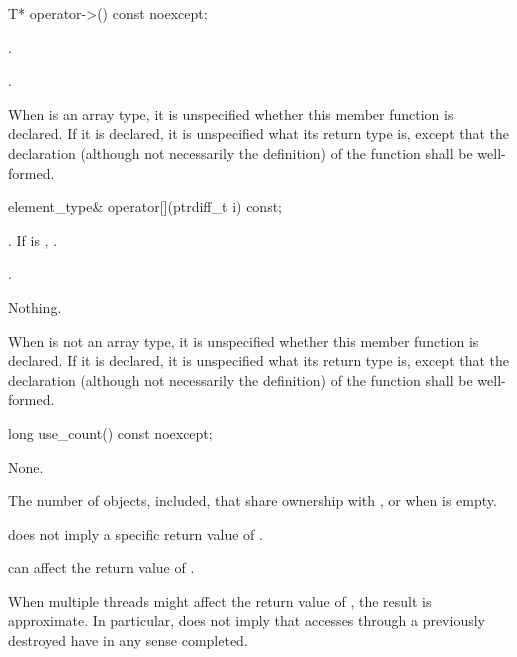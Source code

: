 %
\begin{itemdecl}
T* operator->() const noexcept;
\end{itemdecl}

\begin{itemdescr}
\pnum
\expects
{}.

\pnum
\returns
{}.

\pnum
\remarks
When  is an array type,
it is unspecified whether this member function is declared.
If it is declared, it is unspecified what its return type is,
except that the declaration (although not necessarily the definition)
of the function shall be well-formed.
\end{itemdescr}

%
\begin{itemdecl}
element_type& operator[](ptrdiff_t i) const;
\end{itemdecl}

\begin{itemdescr}
\pnum
\expects
{}.
If  is , .

\pnum
\returns
{}.

\pnum
\throws
Nothing.

\pnum
\remarks
When  is not an array type,
it is unspecified whether this member function is declared.
If it is declared, it is unspecified what its return type is,
except that the declaration (although not necessarily the definition)
of the function shall be well-formed.
\end{itemdescr}

%
\begin{itemdecl}
long use_count() const noexcept;
\end{itemdecl}

\begin{itemdescr}
\pnum
\sync
None.

\pnum
\returns
The number of  objects,  included,
that share ownership with , or  when  is
empty.

\pnum
\begin{note}
does not imply a specific return value of .
\end{note}

\pnum
\begin{note}
can affect the return value of .
\end{note}

\pnum
\begin{note}
When multiple threads
might affect the return value of ,
the result is approximate.
In particular,  does not imply that accesses through
a previously destroyed  have in any sense completed.
\end{note}
\end{itemdescr}

